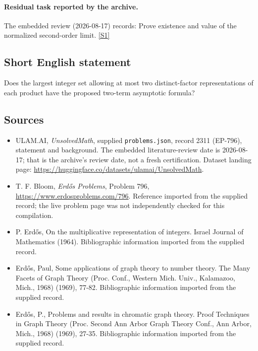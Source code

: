 \documentclass[11pt,a4paper]{article}
\newcommand{\sref}[2]{\hyperlink{source:#1:#2}{[S#2]}}
\begin{document}
\paragraph{Residual task reported by the archive.}

The embedded review (2026-08-17) records: Prove existence and value of the normalized second-order limit. \sref{2311}{1}

\subsection{Short English statement}

Does the largest integer set allowing at most two distinct-factor representations of each product have the proposed two-term asymptotic formula?

\subsection{Sources}

{\small

\begin{itemize}

\item[\hypertarget{source:2311:1}{S1}] ULAM.AI, \emph{UnsolvedMath}, supplied \texttt{problems.json}, record 2311 (EP-796), statement and background. The embedded literature-review date is 2026-08-17; that is the archive’s review date, not a fresh certification. Dataset landing page: \url{https://huggingface.co/datasets/ulamai/UnsolvedMath}.

\item[\hypertarget{source:2311:2}{S2}] T. F. Bloom, \emph{Erdős Problems}, Problem 796, \url{https://www.erdosproblems.com/796}. Reference imported from the supplied record; the live problem page was not independently checked for this compilation.

\item[\hypertarget{source:2311:3}{S3}] P. Erd\H{o}s, On the multiplicative representation of integers. Israel Journal of Mathematics (1964). Bibliographic information imported from the supplied record.

\item[\hypertarget{source:2311:4}{S4}] Erd\H{o}s, Paul, Some applications of graph theory to number theory. The Many Facets of Graph Theory (Proc. Conf., Western Mich. Univ., Kalamazoo, Mich., 1968) (1969), 77-82. Bibliographic information imported from the supplied record.

\item[\hypertarget{source:2311:5}{S5}] Erd\H{o}s, P., Problems and results in chromatic graph theory. Proof Techniques in Graph Theory (Proc. Second Ann Arbor Graph Theory Conf., Ann Arbor, Mich., 1968) (1969), 27-35. Bibliographic information imported from the supplied record.

\end{itemize}

}

\label{end:2311}
\end{document}
